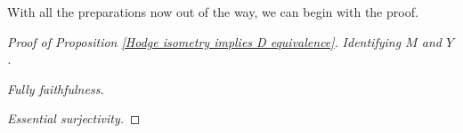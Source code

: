 \noindent
With all the preparations now out of the way, we can begin with the proof.
\begin{proof}[Proof of Proposition \ref{Hodge isometry implies D equivalence}]
    \vspace{0.5 cm}
    \noindent
    \textsl{Identifying $M$ and $Y$.}

    \vspace{0.5 cm}
    \noindent
    \textsl{Fully faithfulness.}

    \vspace{0.5 cm}
    \noindent
    \textsl{Essential surjectivity.}
    
\end{proof}